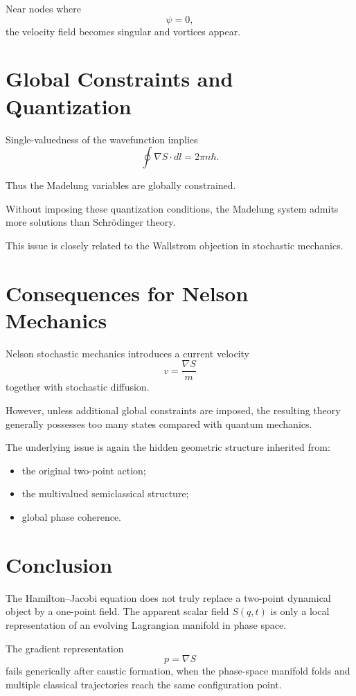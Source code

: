 \documentclass[11pt]{article}
\begin{document}
Near nodes where
\[
\psi=0,
\]
the velocity field becomes singular and vortices appear.

\section{Global Constraints and Quantization}

Single-valuedness of the wavefunction implies
\begin{equation}
\oint \nabla S\cdot dl
=
2\pi n\hbar.
\end{equation}

Thus the Madelung variables are globally constrained.

Without imposing these quantization conditions, the Madelung system admits more solutions than Schr\"odinger theory.

This issue is closely related to the Wallstrom objection in stochastic mechanics.

\section{Consequences for Nelson Mechanics}

Nelson stochastic mechanics introduces a current velocity
\[
v=\frac{\nabla S}{m}
\]
together with stochastic diffusion.

However, unless additional global constraints are imposed, the resulting theory generally possesses too many states compared with quantum mechanics.

The underlying issue is again the hidden geometric structure inherited from:
\begin{itemize}
\item the original two-point action;
\item the multivalued semiclassical structure;
\item global phase coherence.
\end{itemize}

\section{Conclusion}

The Hamilton--Jacobi equation does not truly replace a two-point dynamical object by a one-point field. The apparent scalar field $S(q,t)$ is only a local representation of an evolving Lagrangian manifold in phase space.

The gradient representation
\[
p=\nabla S
\]
fails generically after caustic formation, when the phase-space manifold folds and multiple classical trajectories reach the same configuration point.
\end{document}
